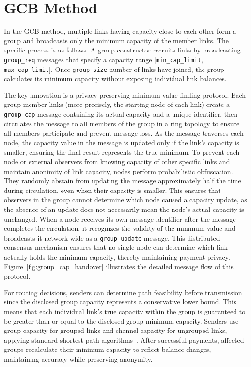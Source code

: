 \documentclass[conference]{IEEEtran}
\newcommand{\groupcap}{\texttt{group\_cap}}
\newcommand{\groupupdate}{\texttt{group\_update}}
\newcommand{\groupreq}{\texttt{group\_req}}
\newcommand{\groupsize}{\texttt{group\_size}}
\newcommand{\mincaplimit}{\texttt{min\_cap\_limit}}
\newcommand{\maxcaplimit}{\texttt{max\_cap\_limit}}
\begin{document}
\section{GCB Method}

In the GCB method, multiple links having capacity close to each other form a group and broadcasts only the minimum capacity of the member links.
The specific process is as follows.
A group constructor recruits links by broadcasting \groupreq{} messages that specify a capacity range [\mincaplimit{}, \maxcaplimit{}].
Once \groupsize{} number of links have joined, the group calculates its minimum capacity without exposing individual link balances.

The key innovation is a privacy-preserving minimum value finding protocol.
Each group member links (more precisely, the starting node of each link) create a \groupcap{} message containing its actual capacity and a unique identifier, then circulates the message to all members of the group in a ring topology to ensure all members participate and prevent message loss.
As the message traverses each node, the capacity value in the message is updated only if the link's capacity is smaller, ensuring the final result represents the true minimum.
To prevent each node or external observers from knowing capacity of other specific links and maintain anonimity of link capacity, nodes perform probabilistic obfuscation.
They randomly abstain from updating the message approximately half the time during circulation, even when their capacity is smaller.
This ensures that observers in the group cannot determine which node caused a capacity update, as the absence of an update does not necessarily mean the node's actual capacity is unchanged.
When a node receives its own message identifier after the message completes the circulation, it recognizes the validity of the minimum value and broadcasts it network-wide as a \groupupdate{} message.
This distributed consensus mechanism ensures that no single node can determine which link actually holds the minimum capacity, thereby maintaining payment privacy.
Figure~\ref{fig:group_cap_handover} illustrates the detailed message flow of this protocol.

For routing decisions, senders can determine path feasibility before transmission since the disclosed group capacity represents a conservative lower bound.
This means that each individual link's true capacity within the group is guaranteed to be greater than or equal to the disclosed group minimum capacity.
Senders use group capacity for grouped links and channel capacity for ungrouped links, applying standard shortest-path algorithms~\cite{lnd,eclair,clightning}.
After successful payments, affected groups recalculate their minimum capacity to reflect balance changes, maintaining accuracy while preserving anonymity.
\end{document}
